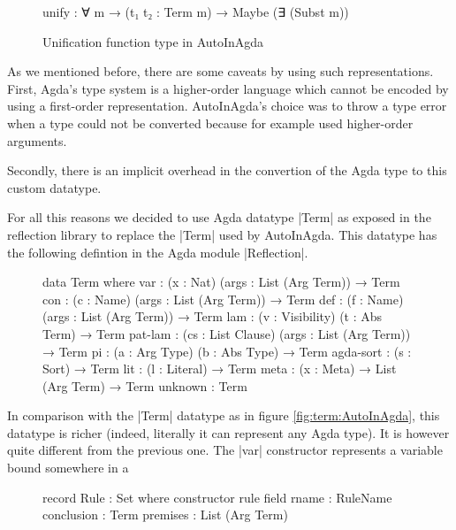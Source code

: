 \documentclass[12pt]{article}
\begin{document}
\begin{figure}
\label{fig:unify:AutoInAgda}
\begin{code}
  unify : ∀ {m} → (t₁ t₂ : Term m) → Maybe (∃ (Subst m))
\end{code}
  \caption{Unification function type in AutoInAgda}
\end{figure}

As we mentioned before, there are some caveats by using such representations.
First, Agda's type system is a higher-order language which cannot be encoded
by using a first-order representation. AutoInAgda's choice was to throw a type
error when a type could not be converted because for example used higher-order
arguments.

Secondly, there is an implicit overhead in the convertion of the Agda type to
this custom datatype.

For all this reasons we decided to use Agda datatype |Term| as exposed in the
reflection library to replace the |Term| used by AutoInAgda.
This datatype has the following defintion in the Agda module |Reflection|.

\begin{figure}
  \label{fig:term:reflection}
\begin{code}
  data Term where
    var       : (x : Nat) (args : List (Arg Term)) → Term
    con       : (c : Name) (args : List (Arg Term)) → Term
    def       : (f : Name) (args : List (Arg Term)) → Term
    lam       : (v : Visibility) (t : Abs Term) → Term
    pat-lam   : (cs : List Clause) (args : List (Arg Term)) → Term
    pi        : (a : Arg Type) (b : Abs Type) → Term
    agda-sort : (s : Sort) → Term
    lit       : (l : Literal) → Term
    meta      : (x : Meta) → List (Arg Term) → Term
    unknown   : Term
\end{code}
\end{figure}

In comparison with the |Term| datatype as in figure \ref{fig:term:AutoInAgda},
this datatype is richer (indeed, literally it can represent any Agda type). It
is however quite different from the previous one. The |var| constructor
represents a variable bound somewhere in a

\begin{figure}
\begin{code}
  record Rule : Set where
    constructor rule
    field
      rname       : RuleName
      conclusion  : Term
      premises    : List (Arg Term)
\end{code}
\end{figure}
\end{document}
